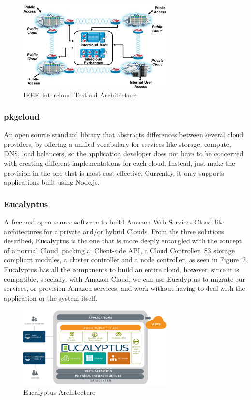  
\begin{figure}[h!]
    \centering
    \includegraphics[width=0.7\textwidth]{img/testbed-technology.jpg}
    \caption{IEEE Intercloud Testbed Architecture}
    \label{fig:IEEE Intercloud Testbed Architecture}
\end{figure}

\subsubsection{pkgcloud}\label{par:pkgcloud}

An open source standard library that abstracts differences between several cloud providers, by offering a unified vocabulary for services like storage, compute, DNS, load balancers, so the application developer does not have to be concerned with creating different implementations for each cloud. Instead, just make the provision in the one that is most cost-effective. Currently, it only supports applications built using Node.js.

\subsubsection{Eucalyptus}\label{par:Eucalyptus}

A free and open source software to build Amazon Web Services Cloud like architectures for a private and/or hybrid Clouds. From the three solutions described, Eucalyptus is the one that is more deeply entangled with the concept of a normal Cloud, packing a: Client-side API, a Cloud Controller, S3 storage compliant modules, a cluster controller and a node controller, as seen in Figure~\ref{fig:eucalyptus}. Eucalyptus has all the components to build an entire cloud, however, since it is compatible, specially, with Amazon Cloud, we can use Eucalyptus to migrate our services, or provision Amazon services, and work without having to deal with the application or the system itself.

\begin{figure}[h!]
  \centering
  \includegraphics[width=0.7\textwidth]{img/eucalyptus-architecture.png}
  \caption{Eucalyptus Architecture}
  \label{fig:eucalyptus}
\end{figure}


